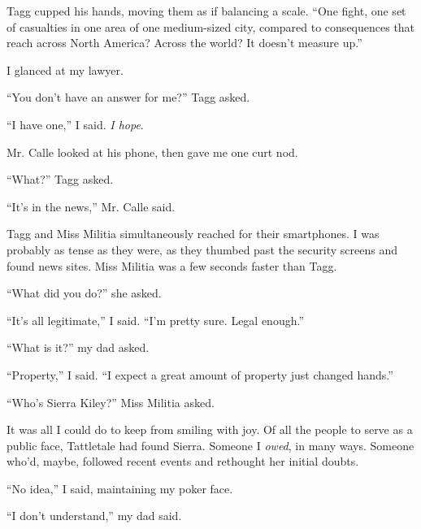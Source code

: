 Tagg cupped his hands, moving them as if balancing a scale.  ``One fight, one set of casualties in one area of one medium-sized city, compared to consequences that reach across North America?  Across the world?  It doesn't measure up.''



I glanced at my lawyer.



``You don't have an answer for me?'' Tagg asked.



``I have one,'' I said.  \emph{I hope}.



Mr. Calle looked at his phone, then gave me one curt nod.



``What?'' Tagg asked.



``It's in the news,'' Mr. Calle said.



Tagg and Miss Militia simultaneously reached for their smartphones.  I was probably as tense as they were, as they thumbed past the security screens and found news sites.  Miss Militia was a few seconds faster than Tagg.



``What did you do?'' she asked.



``It's all legitimate,'' I said.  ``I'm pretty sure.  Legal enough.''



``What is it?'' my dad asked.



``Property,'' I said.  ``I expect a great amount of property just changed hands.''



``Who's Sierra Kiley?'' Miss Militia asked.



It was all I could do to keep from smiling with joy.  Of all the people to serve as a public face, Tattletale had found Sierra.  Someone I \emph{owed}, in many ways.  Someone who'd, maybe, followed recent events and rethought her initial doubts.



``No idea,'' I said, maintaining my poker face.



``I don't understand,'' my dad said.



